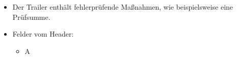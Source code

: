\begin{itemize}
    \item Der Trailer enthält fehlerprüfende Maßnahmen, wie beispielsweise eine Prüfsumme.
    \item Felder vom Header:
    \begin{itemize}
        \item \todo A
    \end{itemize}
\end{itemize}